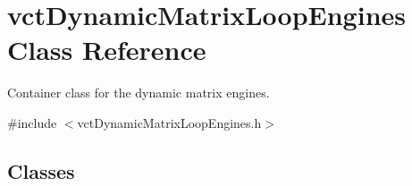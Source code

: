 \hypertarget{classvct_dynamic_matrix_loop_engines}{}\section{vct\+Dynamic\+Matrix\+Loop\+Engines Class Reference}
\label{classvct_dynamic_matrix_loop_engines}


Container class for the dynamic matrix engines.  




{\ttfamily \#include $<$vct\+Dynamic\+Matrix\+Loop\+Engines.\+h$>$}

\subsection*{Classes}
